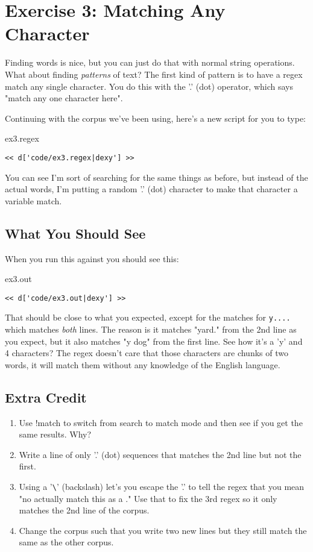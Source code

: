\chapter{Exercise 3: Matching Any Character}

Finding words is nice, but you can just do that with normal
string operations.  What about finding \emph{patterns} of text?
The first kind of pattern is to have a regex match any single 
character.  You do this with the '.' (dot) operator, which
says "match any one character here".

Continuing with the corpus we've been using, here's
a new script for you to type:

\begin{code}{ex3.regex}
\begin{Verbatim}
<< d['code/ex3.regex|dexy'] >>
\end{Verbatim}
\end{code}

You can see I'm sort of searching for the same things as before, but instead
of the actual words, I'm putting a random '.' (dot) character to make that
character a variable match.

\section{What You Should See}

When you run this against  you should see this:

\begin{code}{ex3.out}
\begin{Verbatim}
<< d['code/ex3.out|dexy'] >>
\end{Verbatim}
\end{code}

That should be close to what you expected, except for the matches for
\verb|y....| which matches \emph{both} lines.  The reason is it matches
"yard." from the 2nd line as you expect, but it also matches "y dog"
from the first line.  See how it's a 'y' and 4 characters?  The regex
doesn't care that those characters are chunks of two words, it will match
them without any knowledge of the English language.


\section{Extra Credit}

\begin{enumerate}
\item Use !match to switch from search to match mode and then see if you
    get the same results.  Why?
\item Write a line of only '.' (dot) sequences that matches the 2nd line
    but not the first.
\item Using a '\verb|\|' (backslash) let's you escape the '.' to tell the regex
    that you mean "no actually match this as a ."  Use that to fix the
    3rd regex so it only matches the 2nd line of the corpus.
\item Change the corpus such that you write two new lines but they still
    match the same as the other corpus.
\end{enumerate}

